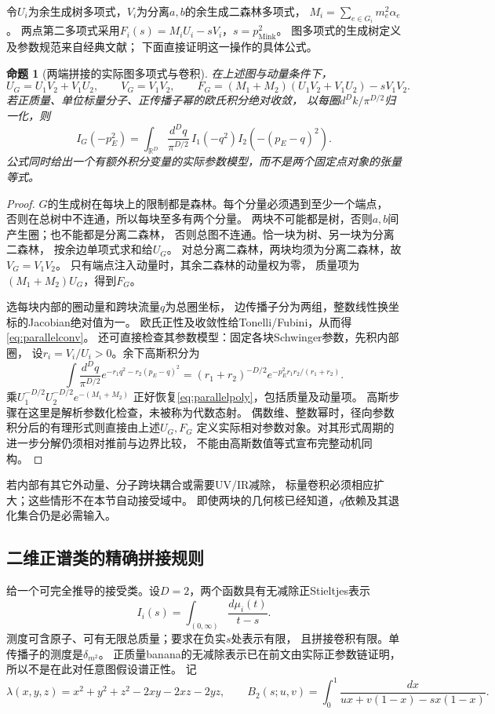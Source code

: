 \documentclass[11pt,a4paper]{ctexart}
\theoremstyle{cnplain}\newtheorem{theorem}{定理}[section]
\newtheorem{proposition}[theorem]{命题}
\theoremstyle{definition}\newtheorem{definition}[theorem]{定义}
\theoremstyle{remark}\newtheorem{remark}[theorem]{注}
\begin{document}
令$U_i$为余生成树多项式，$V_i$为分离$a,b$的余生成二森林多项式，
$M_i=\sum_{e\in G_i}m_e^2\alpha_e$。
两点第二多项式采用$F_i(s)=M_iU_i-sV_i$，$s=p_{\mathrm{Mink}}^2$。
图多项式的生成树定义及参数规范来自经典文献\cite{BWpoly}；
下面直接证明这一操作的具体公式。

\begin{proposition}[两端拼接的实际图多项式与卷积]\label{prop:parallelpoly}
在上述图与动量条件下，
\begin{equation}\label{eq:parallelpoly}
 U_G=U_1V_2+V_1U_2,\qquad V_G=V_1V_2,\qquad
 F_G=(M_1+M_2)(U_1V_2+V_1U_2)-sV_1V_2 .
\end{equation}
若正质量、单位标量分子、正传播子幂的欧氏积分绝对收敛，
以每圈$d^Dk/\pi^{D/2}$归一化，则
\begin{equation}\label{eq:parallelconv}
 I_G(-p_E^2)=\int_{\mathbb R^D}\frac{d^Dq}{\pi^{D/2}}\,
       I_1(-q^2)I_2(-(p_E-q)^2).
\end{equation}
公式同时给出一个有额外积分变量的实际参数模型，而不是两个固定点对象的张量等式。
\end{proposition}
\begin{proof}
$G$的生成树在每块上的限制都是森林。每个分量必须遇到至少一个端点，
否则在总树中不连通，所以每块至多有两个分量。
两块不可能都是树，否则$a,b$间产生圈；也不能都是分离二森林，
否则总图不连通。恰一块为树、另一块为分离二森林，
按余边单项式求和给$U_G$。
对总分离二森林，两块均须为分离二森林，故$V_G=V_1V_2$。
只有端点注入动量时，其余二森林的动量权为零，
质量项为$(M_1+M_2)U_G$，得到$F_G$。

选每块内部的圈动量和跨块流量$q$为总圈坐标，
边传播子分为两组，整数线性换坐标的Jacobian绝对值为一。
欧氏正性及收敛性给Tonelli/Fubini，从而得\eqref{eq:parallelconv}。
还可直接检查其参数模型：固定各块Schwinger参数，先积内部圈，
设$r_i=V_i/U_i>0$。余下高斯积分为
\[
 \int\frac{d^Dq}{\pi^{D/2}}
  e^{-r_1q^2-r_2(p_E-q)^2}
  =(r_1+r_2)^{-D/2}
   e^{-p_E^2r_1r_2/(r_1+r_2)} .
\]
乘$U_1^{-D/2}U_2^{-D/2}e^{-(M_1+M_2)}$
正好恢复\eqref{eq:parallelpoly}，包括质量及动量项。
高斯步骤在这里是解析参数化检查，未被称为代数态射。
偶数维、整数幂时，径向参数积分后的有理形式则直接由上述$U_G,F_G$
定义实际相对参数对象。对其形式周期的进一步分解仍须相对推前与边界比较，
不能由高斯数值等式宣布完整动机同构。
\end{proof}

若内部有其它外动量、分子跨块耦合或需要UV/IR减除，
标量卷积必须相应扩大；这些情形不在本节自动接受域中。
即使两块的几何核已经知道，$q$依赖及其退化集合仍是必需输入。

\subsection{二维正谱类的精确拼接规则}
给一个可完全推导的接受类。设$D=2$，两个函数具有无减除正Stieltjes表示
\[
 I_i(s)=\int_{(0,\infty)}\frac{d\mu_i(t)}{t-s}.
\]
测度可含原子、可有无限总质量；要求在负实$s$处表示有限，
且拼接卷积有限。单传播子的测度是$\delta_{m^2}$。
正质量banana的无减除表示已在前文由实际正参数链证明，
所以不是在此对任意图假设谱正性。
记
\[
 \lambda(x,y,z)=x^2+y^2+z^2-2xy-2xz-2yz,\qquad
 B_2(s;u,v)=\int_0^1\frac{dx}{ux+v(1-x)-sx(1-x)} .
\]
\end{document}
